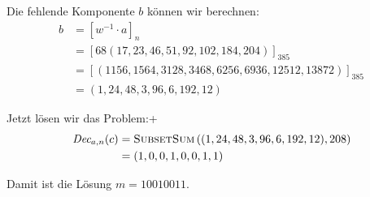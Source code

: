 \documentclass{../crypto}
\begin{document}
Die fehlende Komponente $b$ können wir berechnen:
\begin{align*}
  b &= [w^{-1} \cdot a]_{n} \\
    &= \left[68 (17, 23, 46, 51, 92, 102, 184, 204)\right]_{385} \\
    &= \left[(1156, 1564, 3128, 3468, 6256, 6936, 12512, 13872)\right]_{385} \\
    &= (1, 24, 48, 3, 96, 6, 192, 12)
\end{align*}

Jetzt lösen wir das Problem:+
\begin{align*}
  \textit{Dec}_{a, n}(c) &= \text{\textsc{SubsetSum}}\left((1, 24, 48, 3, 96, 6, 192, 12), 208\right) \\
                         &= (1, 0, 0, 1, 0, 0, 1, 1)
\end{align*}

Damit ist die Lösung $m = 10010011$.
\end{document}
